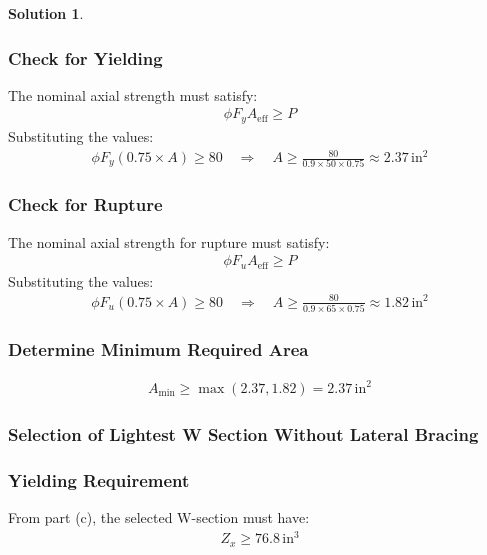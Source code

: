 \documentclass[12pt]{article}
\theoremstyle{definition} %
\newtheorem{solution}{Solution}
\theoremstyle{plain} %
\begin{document}
\begin{solution}
\begin{enumerate}
\subsubsection*{Check for Yielding}
The nominal axial strength must satisfy:
\begin{align}
\phi F_y A_{\text{eff}} \geq P
\end{align}
Substituting the values:
\begin{align}
\phi F_y (0.75 \times A) \geq 80 \quad \Rightarrow \quad A \geq \frac{80}{0.9 \times 50 \times 0.75} \approx 2.37 \, \text{in}^2
\end{align}

\subsubsection*{Check for Rupture}
The nominal axial strength for rupture must satisfy:
\begin{align}
\phi F_u A_{\text{eff}} \geq P
\end{align}
Substituting the values:
\begin{align}
\phi F_u (0.75 \times A) \geq 80 \quad \Rightarrow \quad A \geq \frac{80}{0.9 \times 65 \times 0.75} \approx 1.82 \, \text{in}^2
\end{align}

\subsubsection*{Determine Minimum Required Area}
\begin{align}
A_{\text{min}} \geq \max(2.37, 1.82) = 2.37 \, \text{in}^2
\end{align}

\subsubsection*{Selection of Lightest W Section Without Lateral Bracing}

\subsubsection*{Yielding Requirement}
From part (c), the selected W-section must have:
\begin{align}
Z_x \geq 76.8 \, \text{in}^3
\end{align}


\end{enumerate}
\end{solution}
\end{document}
